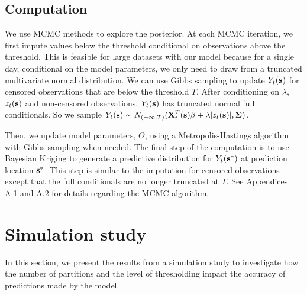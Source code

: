\documentclass[11pt]{article}
\begin{document}
\subsection{Computation}\label{s:comp}
We use MCMC methods to explore the posterior.
At each MCMC iteration, we first impute values below the threshold conditional on observations above the threshold.
This is feasible for large datasets with our model because for a single day, conditional on the model parameters, we only need to draw from a truncated multivariate normal distribution.
We can use Gibbs sampling to update $Y_t(\mbox{\bf s})$ for censored observations that are below the threshold $T$.
After conditioning on $\lambda$, $z_t(\mbox{\bf s})$ and non-censored observations, $Y_t(\mbox{\bf s})$ has truncated normal full conditionals.
So we sample $Y_t(\mbox{\bf s}) \sim N_{(-\infty, T)}(\mbox{\bf X}_t^T(\mbox{\bf s}) \beta + \lambda | z_t(\mbox{\bf s})|, \mbox{\boldmath $\Sigma$})$.

Then, we update model parameters, $\Theta$, using a Metropolis-Hastings algorithm with Gibbs sampling when needed.
The final step of the computation is to use Bayesian Kriging to generate a predictive distribution for $Y_t(\mbox{\bf s}^*)$ at prediction location $\mbox{\bf s}^*$.
This step is similar to the imputation for censored observations except that the full conditionals are no longer truncated at $T$.
See Appendices A.1 and A.2 for details regarding the MCMC algorithm.

\section{Simulation study}\label{s:simstudy}
In this section, we present the results from a simulation study to investigate how the number of partitions and the level of thresholding impact the accuracy of predictions made by the model.
\end{document}
